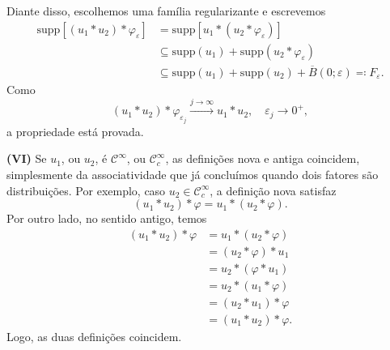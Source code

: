 \documentclass[../distribution_theory_notes.tex]{subfiles}
\begin{document}
\begin{proof*}
	Diante disso, escolhemos uma família regularizante e escrevemos
	\begin{align*}
		\mathrm{supp}[(u_{1}*u_{2})*\varphi_{\varepsilon}]
		 & =\mathrm{supp}[u_{1}*(u_{2}*\varphi_{\varepsilon})]                             \\
		 & \subseteq \mathrm{supp}(u_{1})+\mathrm{supp}(u_{2}*\varphi_{\varepsilon})       \\
		 & \subseteq \mathrm{supp}(u_{1})+\mathrm{supp}(u_{2})+\overline{B}(0;\varepsilon)
		\eqqcolon F_{\varepsilon}.
	\end{align*}
	Como
	\[
		(u_{1}*u_{2})*\varphi_{\varepsilon_{j}}
		\stackrel{j\to\infty}{\longrightarrow}u_{1}*u_{2},
		\quad \varepsilon_{j}\to0^{+},
	\]
	a propriedade está provada.

	\textbf{(VI)} Se \(u_{1}\), ou \(u_{2}\), é \(\mathcal{C}^{\infty}\), ou \(\mathcal{C}_{c}^{\infty}\), as definições nova e antiga coincidem, simplesmente da associatividade que já concluímos quando dois fatores são distribuições. Por exemplo, caso \(u_{2}\in \mathcal{C}_{c}^{\infty}\), a definição nova satisfaz
	\[
		(u_{1}*u_{2})*\varphi=u_{1}*(u_{2}*\varphi).
	\]
	Por outro lado, no sentido antigo, temos
	\begin{align*}
		(u_{1}*u_{2})*\varphi
		 & =u_{1}*(u_{2}*\varphi)  \\
		 & =(u_{2}*\varphi)*u_{1}  \\
		 & =u_{2}*(\varphi*u_{1})  \\
		 & =u_{2}*(u_{1}*\varphi)  \\
		 & =(u_{2}*u_{1})*\varphi  \\
		 & =(u_{1}*u_{2})*\varphi.
	\end{align*}
	Logo, as duas definições coincidem. \qedsymbol
\end{proof*}
\end{document}
